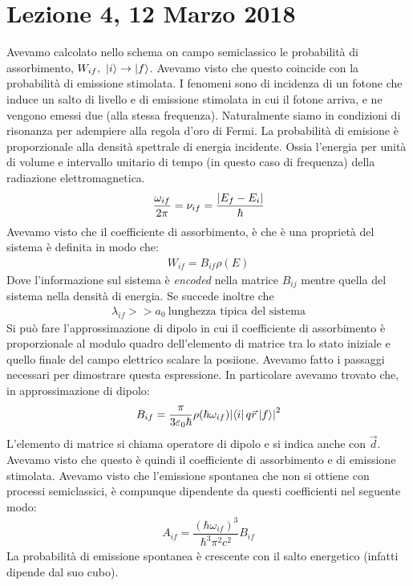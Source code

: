 \documentclass[10pt, a4paper]{article}
\begin{document}
	\section*{Lezione 4, 12 Marzo 2018}
	
	Avevamo calcolato nello schema on campo semiclassico le probabilità di assorbimento, $ W_{if},\ \ket{i}\to\ket{f} $. Avevamo visto che questo coincide con la probabilità di emissione stimolata. I fenomeni sono di incidenza di un fotone che induce un salto di livello e di emissione stimolata in cui il fotone arriva, e ne vengono emessi due (alla stessa frequenza). Naturalmente siamo in condizioni di risonanza per adempiere alla regola d'oro di Fermi. La probabilità di emisione è proporzionale alla densità spettrale di energia incidente. Ossia l'energia per unità di volume e intervallo unitario di tempo (in questo caso di frequenza) della radiazione elettromagnetica. 
	\begin{gather*}
	\dfrac{\omega_{if}}{2\pi}=\nu_{if}=\dfrac{\abs{E_{f}-E_{i}}}{\hbar}
	\end{gather*}
	Avevamo visto che il coefficiente di assorbimento, è che è una proprietà del sistema è definita in modo che:
	\begin{gather*}
	W_{if}=B_{if}\rho(E)
	\end{gather*}
	Dove l'informazione sul sistema è \emph{encoded} nella matrice $ B_{ij} $ mentre quella del sistema nella densità di energia. Se succede inoltre che 
	\begin{gather*}
	\lambda_{if}>>a_{0}\ \text{lunghezza tipica del sistema}
	\end{gather*}
	Si può fare l'approssimazione di dipolo in cui il coefficiente di assorbimento è proporzionale al modulo quadro dell'elemento di matrice tra lo stato iniziale e quello finale del campo elettrico  scalare la posiione. Avevamo fatto i passaggi necessari per dimostrare questa espressione. In particolare avevamo trovato che, in approssimazione di dipolo:
	\begin{gather*}
	B_{if}=\dfrac{\pi}{3\varepsilon_{0}\hbar}\rho(\hbar\omega_{if})\abs{\bra{i}q\vec{r}\ket{f}}^{2}
	\end{gather*}
	L'elemento di matrice si chiama operatore di dipolo e si indica anche con $ \vec{d} $. Avevamo visto che questo è quindi il coefficiente di assorbimento e di emissione stimolata. Avevamo visto che l'emissione spontanea che non si ottiene con processi semiclassici, è compunque dipendente da questi coefficienti nel seguente modo:
	\begin{gather*}
	A_{if}=\dfrac{\left(\hbar\omega_{if}\right)^{3}}{\hbar^{3}\pi^{2}c^{2}}B_{if}
	\end{gather*}
	La probabilità di emissione spontanea è crescente con il salto energetico (infatti dipende dal suo cubo).
	
\end{document}
